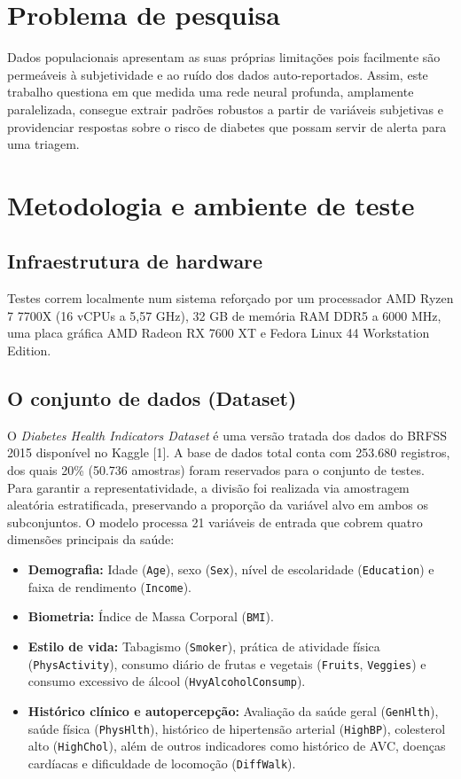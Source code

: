 \documentclass[
    12pt,
    article,
    oneside,
    a4paper,
    english,
    brazil
]{abntex2}
\begin{document}
\section{Problema de pesquisa}
Dados populacionais apresentam as suas próprias limitações pois facilmente são permeáveis à subjetividade e ao ruído dos dados auto-reportados. Assim, este trabalho questiona em que medida uma rede neural profunda, amplamente paralelizada, consegue extrair padrões robustos a partir de variáveis subjetivas e providenciar respostas sobre o risco de diabetes que possam servir de alerta para uma triagem.

\section{Metodologia e ambiente de teste}\label{metodologia-e-ambiente-de-teste}
\subsection{Infraestrutura de hardware}\label{infraestrutura-de-hardware}
Testes correm localmente num sistema reforçado por um processador AMD Ryzen 7 7700X (16 vCPUs a 5,57 GHz), 32 GB de memória RAM DDR5 a 6000 MHz, uma placa gráfica AMD Radeon RX 7600 XT e Fedora Linux 44 Workstation Edition.

\subsection{O conjunto de dados (Dataset)}\label{o-conjunto-de-dados-dataset}
O \emph{Diabetes Health Indicators Dataset} é uma versão tratada dos dados do BRFSS 2015 disponível no Kaggle [1]. A base de dados total conta com 253.680 registros, dos quais 20\% (50.736 amostras) foram reservados para o conjunto de testes. Para garantir a representatividade, a divisão foi realizada via amostragem aleatória estratificada, preservando a proporção da variável alvo em ambos os subconjuntos. O modelo processa 21 variáveis de entrada que cobrem quatro dimensões principais da saúde: 

\begin{itemize}
    \item \textbf{Demografia:} Idade (\texttt{Age}), sexo (\texttt{Sex}), nível de escolaridade (\texttt{Education}) e faixa de rendimento (\texttt{Income}).
    \item \textbf{Biometria:} Índice de Massa Corporal (\texttt{BMI}).
    \item \textbf{Estilo de vida:} Tabagismo (\texttt{Smoker}), prática de atividade física (\texttt{PhysActivity}), consumo diário de frutas e vegetais (\texttt{Fruits}, \texttt{Veggies}) e consumo excessivo de álcool (\texttt{HvyAlcoholConsump}).
    \item \textbf{Histórico clínico e autopercepção:} Avaliação da saúde geral (\texttt{GenHlth}), saúde física (\texttt{PhysHlth}), histórico de hipertensão arterial (\texttt{HighBP}), colesterol alto (\texttt{HighChol}), além de outros indicadores como histórico de AVC, doenças cardíacas e dificuldade de locomoção (\texttt{DiffWalk}).
\end{itemize}
\end{document}
